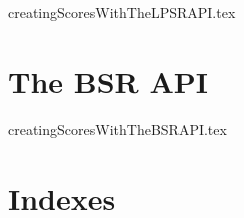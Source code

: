\documentclass[11pt,a4paper]{report}
\begin{document}
{creatingScoresWithTheLPSRAPI.tex}


\part{The BSR API}


{creatingScoresWithTheBSRAPI.tex}



\part{Indexes}

\useListsPagesHeadersAndFooters

\printindex[Files]

\printindex[Options]

\printindex[MusicXML]

\printindex[Main]


\end{document}
